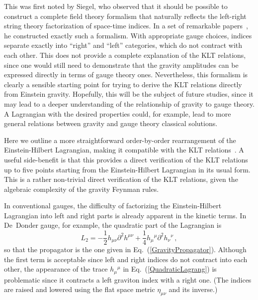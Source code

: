 This was first noted by Siegel, who observed that it should be possible
to construct a complete field theory formalism that naturally reflects the
left-right string theory factorization of space-time indices.  In a
set of remarkable papers~\cite{Siegel93A,Siegel93B,Siegel94}, he
constructed exactly such a formalism.  With appropriate gauge choices,
indices separate exactly into ``right'' and ``left'' categories, which do
not contract with each other. This does not provide
a complete explanation of the KLT relations, since one would still need
to demonstrate that the gravity amplitudes can be expressed directly
in terms of gauge theory ones.  Nevertheless, this formalism is
clearly a sensible starting point for trying to derive the KLT
relations directly from Einstein gravity.  Hopefully, this will be the
subject of future studies, since it may lead to a deeper understanding
of the relationship of gravity to gauge theory.  A Lagrangian with the
desired properties could, for example, lead to more general relations
between gravity and gauge theory classical solutions.

Here we outline a more straightforward order-by-order rearrangement of
the Einstein-Hilbert Lagrangian, making it compatible with the KLT
relations~\cite{BernGrant}.  A useful side-benefit is that this
provides a direct verification of the KLT relations up to
five points starting from the Einstein-Hilbert Lagrangian in its usual
form.  This is a rather non-trivial direct verification of the KLT
relations, given the algebraic complexity of the gravity Feynman
rules.

In conventional gauges, the difficulty of factorizing the
Einstein-Hilbert Lagrangian into left and right parts is already
apparent in the kinetic terms. In De~Donder gauge, for example, the
quadratic part of the Lagrangian is
%
\begin{equation}
L_2 =  - \frac{1}{2} h_{\mu\nu} \partial^2 h^{\mu\nu} 
+ \frac{1}{4} h_{\mu}{}^{\mu} \partial^2 h_{\nu}{}^{\nu} \,,
\label{QuadraticLagrang}
\end{equation}
%
so that the propagator is the one given in
Eq.~(\ref{GravityPropagator}).  Although the first term is acceptable
since left and right indices do not contract into each other, the
appearance of the trace $h_{\mu}{}^{\mu}$ in
Eq.~(\ref{QuadraticLagrang}) is problematic since it contracts a left
graviton index with a right one. (The indices are raised and lowered
using the flat space metric $\eta_{\mu\nu}$ and its inverse.)

